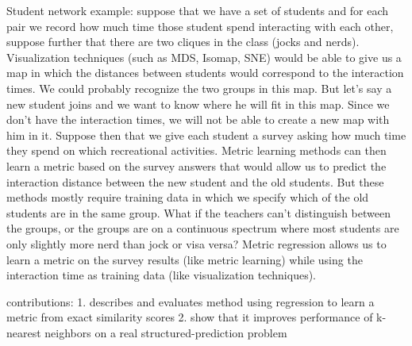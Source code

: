 \documentclass[a4paper,titlepage]{article}
\begin{document}


Student network example: suppose that we have a set of students and for each pair we record how much time those student spend interacting with each other, suppose further that there are two cliques in the class (jocks and nerds). Visualization techniques (such as MDS, Isomap, SNE) would be able to give us a map in which the distances between students would correspond to the interaction times. We could probably recognize the two groups in this map. But let's say a new student joins and we want to know where he will fit in this map. Since we don't have the interaction times, we will not be able to create a new map with him in it. Suppose then that we give each student a survey asking how much time they spend on which recreational activities. Metric learning methods can then learn a metric based on the survey answers that would allow us to predict the interaction distance between the new student and the old students. But these methods mostly require training data in which we specify which of the old students are in the same group. What if the teachers can't distinguish between the groups, or the groups are on a continuous spectrum where most students are only slightly more nerd than jock or visa versa? Metric regression allows us to learn a metric on the survey results (like metric learning) while using the interaction time as training data (like visualization techniques).

contributions: 
1. describes and evaluates method using regression to learn a metric from exact similarity scores 
2. show that it improves performance of k-nearest neighbors on a real structured-prediction problem
\end{document}
